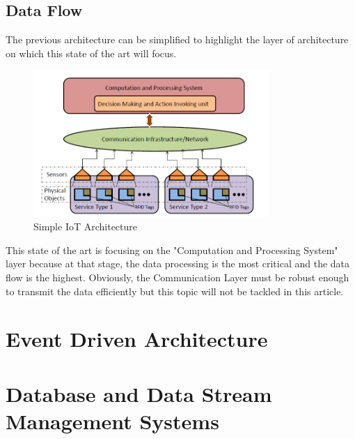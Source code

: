 \documentclass[11pt]{article}
\begin{document}
\subsection{Data Flow}

The previous architecture can be simplified to highlight the layer of architecture on which this state of the art will focus.
\newline
\begin{figure}[h]
	\includegraphics[width=0.8\textwidth]{assets/Basic_IOT_Architecture.png} 
	\caption{Simple IoT Architecture}
	\label{fig:simpleArchitecture}
\end{figure}

This state of the art is focusing on the "Computation and Processing System" layer because at that stage, the data processing is the most critical and the data flow is the highest. Obviously, the Communication Layer must be robust enough to transmit the data efficiently but this topic will not be tackled in this article.

\section{Event Driven Architecture}



\section{Database and Data Stream Management Systems}
\end{document}
